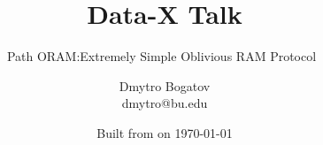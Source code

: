

\ifnotes%
\fi

\title{Data-X Talk} %

\subtitle{Path ORAM:\@An Extremely Simple Oblivious RAM Protocol~\cite{DBLP:journals/corr/abs-1202-5150}}

\date{Built from \href{https://git.dbogatov.org/bu/PathORAM-Talk/commit/\version}{\emph{\version}} on \today}

\author{Dmytro Bogatov \\ dmytro@bu.edu}



\makeatletter
\def\beamer@framenotesbegin{%
	\usebeamercolor[fg]{normal text} 
		\gdef\beamer@noteitems{}%
		\gdef\beamer@notes{}%
}
\makeatother


\newcommand{\BigO}[1]{\mathcal{O}\left(#1\right)}
\newcommand{\RAM}{\textbf{RAM}}
